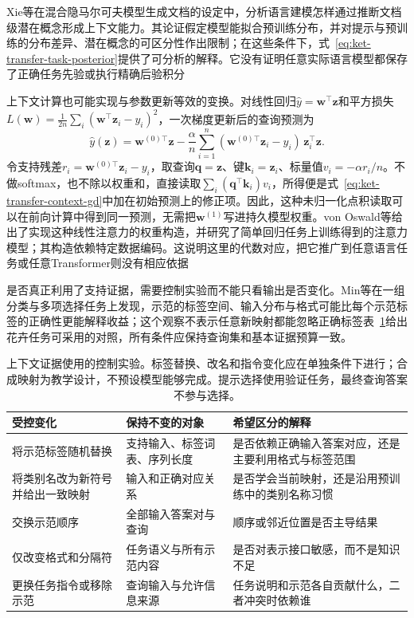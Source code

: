 Xie等在混合隐马尔可夫模型生成文档的设定中，分析语言建模怎样通过推断文档级潜在概念形成上下文能力。其论证假定模型能拟合预训练分布，并对提示与预训练的分布差异、潜在概念的可区分性作出限制；在这些条件下，式~\eqref{eq:ket-transfer-task-posterior}提供了可分析的解释。它没有证明任意实际语言模型都保存了正确任务先验或执行精确后验积分

上下文计算也可能实现与参数更新等效的变换。对线性回归$\hat y=\bm w^\top\bm z$和平方损失$L(\bm w)=\frac1{2n}\sum_i(\bm w^\top\bm z_i-y_i)^2$，一次梯度更新后的查询预测为
\begin{equation}
  \hat y(\bm z)
  =\bm w^{(0)\top}\bm z
   -\frac{\alpha}{n}\sum_{i=1}^{n}
     (\bm w^{(0)\top}\bm z_i-y_i)\,\bm z_i^\top\bm z.
  \label{eq:ket-transfer-context-gd}
\end{equation}
令支持残差$r_i=\bm w^{(0)\top}\bm z_i-y_i$，取查询$\bm q=\bm z$、键$\bm k_i=\bm z_i$、标量值$v_i=-\alpha r_i/n$。不做softmax，也不除以权重和，直接读取$\sum_i(\bm q^\top\bm k_i)v_i$，所得便是式~\eqref{eq:ket-transfer-context-gd}中加在初始预测上的修正项。因此，这种未归一化点积读取可以在前向计算中得到同一预测，无需把$\bm w^{(1)}$写进持久模型权重。von Oswald等给出了实现这种线性注意力的权重构造，并研究了简单回归任务上训练得到的注意力模型；其构造依赖特定数据编码。这说明这里的代数对应，把它推广到任意语言任务或任意Transformer则没有相应依据

\clearpage
是否真正利用了支持证据，需要控制实验而不能只看输出是否变化。Min等在一组分类与多项选择任务上发现，示范的标签空间、输入分布与格式可能比每个示范标签的正确性更能解释收益；这个观察不表示任意新映射都能忽略正确标签表~\ref{tab:ket-transfer-context-controls}给出花卉任务可采用的对照，所有条件应保持查询集和基本证据预算一致。

\begin{table}[tbp]
  \centering
  \small
  \begin{tabularx}{\linewidth}{p{30mm}XX}
    \toprule
    受控变化 & 保持不变的对象 & 希望区分的解释 \\
    \midrule
    将示范标签随机替换 & 支持输入、标签词表、序列长度 & 是否依赖正确输入答案对应，还是主要利用格式与标签范围 \\
    将类别名改为新符号并给出一致映射 & 输入和正确对应关系 & 是否学会当前映射，还是沿用预训练中的类别名称习惯 \\
    交换示范顺序 & 全部输入答案对与查询 & 顺序或邻近位置是否主导结果 \\
    仅改变格式和分隔符 & 任务语义与所有示范内容 & 是否对表示接口敏感，而不是知识不足 \\
    更换任务指令或移除示范 & 查询输入与允许信息来源 & 任务说明和示范各自贡献什么，二者冲突时依赖谁 \\
    \bottomrule
  \end{tabularx}
  \caption{上下文证据使用的控制实验。标签替换、改名和指令变化应在单独条件下进行；合成映射为教学设计，不预设模型能够完成。提示选择使用验证任务，最终查询答案不参与选择。}
  \label{tab:ket-transfer-context-controls}
\end{table}

